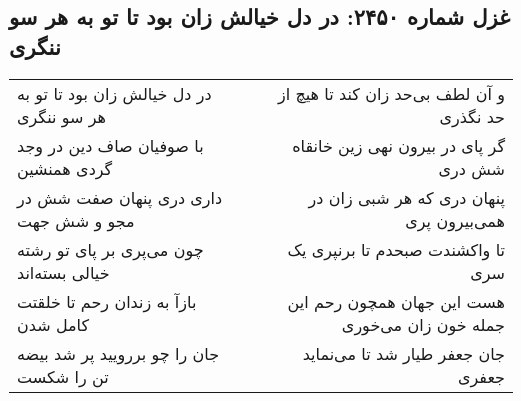 \begin{center}
\section*{غزل شماره ۲۴۵۰: در دل خیالش زان بود تا تو به هر سو ننگری}
\label{sec:2450}
\begin{longtable}{l p{0.5cm} r}
در دل خیالش زان بود تا تو به هر سو ننگری
&&
و آن لطف بی‌حد زان کند تا هیچ از حد نگذری
\\
با صوفیان صاف دین در وجد گردی همنشین
&&
گر پای در بیرون نهی زین خانقاه شش دری
\\
داری دری پنهان صفت شش در مجو و شش جهت
&&
پنهان دری که هر شبی زان در همی‌بیرون پری
\\
چون می‌پری بر پای تو رشته خیالی بسته‌اند
&&
تا واکشندت صبحدم تا برنپری یک سری
\\
بازآ به زندان رحم تا خلقتت کامل شدن
&&
هست این جهان همچون رحم این جمله خون زان می‌خوری
\\
جان را چو بررویید پر شد بیضه تن را شکست
&&
جان جعفر طیار شد تا می‌نماید جعفری
\\
\end{longtable}
\end{center}
